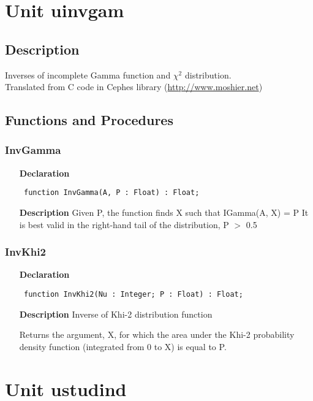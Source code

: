 \documentclass[12pt,a4paper,oneside]{report}
\newcommand{\declarationitem}[1]{\textbf{#1}}
\newcommand{\descriptiontitle}[1]{\textbf{#1}}
\newcommand{\code}[1]{\texttt{#1}}
\begin{document}
\section{Unit uinvgam}
\label{uinvgam}
\subsection{Description}
Inverses of incomplete Gamma function and $\chi^2$ distribution.\\ Translated from C code in Cephes library (\href{http://www.moshier.net}{http://www.moshier.net}) 
\subsection{Functions and Procedures}
\subsubsection{InvGamma}
\label{uinvgam-InvGamma}
\begin{itemize}\item[\declarationitem{Declaration}\hfill]
	\begin{flushleft}
		\code{
			function InvGamma(A, P : Float) : Float;}
	\end{flushleft}
	\item[\descriptiontitle{Description}]
	Given P, the function finds X such that IGamma(A, X) = P It is best valid in the right{-}hand tail of the distribution, P {$>$} 0.5
\end{itemize}
\subsubsection{InvKhi2}
\label{uinvgam-InvKhi2}
\begin{itemize}\item[\declarationitem{Declaration}\hfill]
	\begin{flushleft}
		\code{
			function InvKhi2(Nu : Integer; P : Float) : Float;}
	\end{flushleft}
	\item[\descriptiontitle{Description}]
	Inverse of Khi{-}2 distribution function
	
	Returns the argument, X, for which the area under the Khi{-}2 probability density function (integrated from 0 to X) is equal to P.
\end{itemize}

\section{Unit ustudind}
\label{ustudind}
\end{document}
